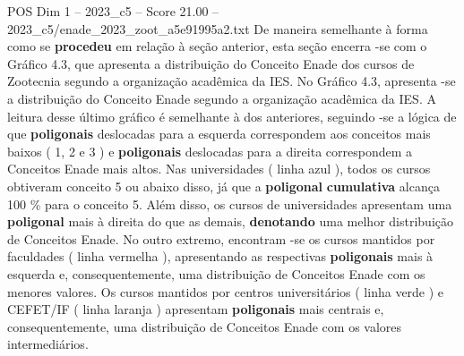 \begin{textsample}{POS Dim 1 – 2023\_c5 – Score 21.00 – 2023\_c5/enade\_2023\_zoot\_a5e91995a2.txt}
De maneira semelhante à forma como se \textbf{procedeu} em relação à seção anterior, esta seção encerra -se com o Gráfico 4.3, que apresenta a distribuição do Conceito Enade dos cursos de Zootecnia segundo a organização acadêmica da IES.
No Gráfico 4.3, apresenta -se a distribuição do Conceito Enade segundo a organização acadêmica da IES.
A leitura desse último gráfico é semelhante à dos anteriores, seguindo -se a lógica de que \textbf{poligonais} deslocadas para a esquerda correspondem aos conceitos mais baixos ( 1, 2 e 3 ) e \textbf{poligonais} deslocadas para a direita correspondem a Conceitos Enade mais altos.
Nas universidades ( linha azul ), todos os cursos obtiveram conceito 5 ou abaixo disso, já que a \textbf{poligonal} \textbf{cumulativa} alcança 100 \% para o conceito 5.
Além disso, os cursos de universidades apresentam uma \textbf{poligonal} mais à direita do que as demais, \textbf{denotando} uma melhor distribuição de Conceitos Enade.
No outro extremo, encontram -se os cursos mantidos por faculdades ( linha vermelha ), apresentando as respectivas \textbf{poligonais} mais à esquerda e, consequentemente, uma distribuição de Conceitos Enade com os menores valores.
Os cursos mantidos por centros universitários ( linha verde ) e CEFET/IF ( linha laranja ) apresentam \textbf{poligonais} mais centrais e, consequentemente, uma distribuição de Conceitos Enade com os valores intermediários.

\end{textsample}
